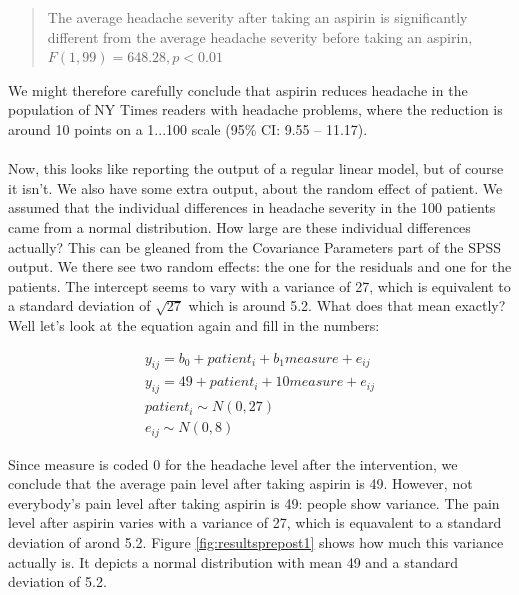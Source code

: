 \documentclass[]{report}\usepackage[]{graphicx}\usepackage[]{color}
\begin{document}
\begin{quote}
{The average headache severity after taking an aspirin is significantly different from the average headache severity before taking an aspirin, $F(1,99) = 648.28, p < 0.01$}\end{quote}


We might therefore carefully conclude that aspirin reduces headache in the population of NY Times readers with headache problems, where the reduction is around 10 points on a 1...100 scale (95\% CI: 9.55 -- 11.17). 
\\
\\
Now, this looks like reporting the output of a regular linear model, but of course it isn't. We also have some extra output, about the random effect of patient. We assumed that the individual differences in headache severity in the 100 patients came from a normal distribution. How large are these individual differences actually? This can be gleaned from the Covariance Parameters part of the SPSS output. We there see two random effects: the one for the residuals and one for the patients. The intercept seems to vary with a variance of 27, which is equivalent to a standard deviation of $\sqrt{27}$ which is around 5.2. What does that mean exactly? Well let's look at the equation again and fill in the numbers:

\begin{eqnarray}
y_{ij} = b_0 + patient_i + b_1 measure + e_{ij} \\
y_{ij} = 49 + patient_i + 10 measure + e_{ij} \\
patient_i \sim N(0, 27)\\
e_{ij} \sim N(0, 8)
\end{eqnarray}

Since measure is coded 0 for the headache level after the intervention, we conclude that the average pain level after taking aspirin is 49. However, not everybody's pain level after taking aspirin is 49: people show variance. The pain level after aspirin varies with a variance of 27, which is equavalent to a standard deviation of arond 5.2. Figure \ref{fig:resultsprepost1} shows how much this variance actually is. It depicts a normal distribution with mean 49 and a standard deviation of 5.2.
\end{document}
